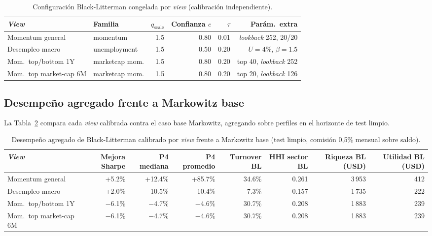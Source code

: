 \begin{table}[h]
\centering
\caption{Configuraci\'on Black-Litterman congelada por \textit{view}
(calibraci\'on independiente).}
\label{tab:configs_views}
\scriptsize
\begin{tabular}{@{}llrrrr@{}}
\toprule
\textit{View} & Familia & $q_{\text{scale}}$ & Confianza $c$ & $\tau$ & Par\'am.\ extra \\
\midrule
Momentum general & momentum & 1.5 & 0.80 & 0.01 & \textit{lookback} 252, 20/20 \\
Desempleo macro & unemployment & 1.5 & 0.50 & 0.20 & $U=4\%$, $\beta=1.5$ \\
Mom.\ top/bottom 1Y & marketcap mom. & 1.5 & 0.80 & 0.20 & top 40, \textit{lookback} 252 \\
Mom.\ top market-cap 6M & marketcap mom. & 1.5 & 0.80 & 0.20 & top 20, \textit{lookback} 126 \\
\bottomrule
\end{tabular}
\end{table}

\subsection{Desempe\~no agregado frente a Markowitz base}

La Tabla~\ref{tab:resumen_views} compara cada \textit{view} calibrada contra el
caso base Markowitz, agregando sobre perfiles en el horizonte de test limpio.

\begin{table}[h]
\centering
\caption{Desempe\~no agregado de Black-Litterman calibrado por \textit{view}
frente a Markowitz base (test limpio, comisi\'on 0,5\% mensual sobre saldo).}
\label{tab:resumen_views}
\scriptsize
\begin{adjustbox}{max width=\textwidth}
\begin{tabular}{@{}lrrrrrrr@{}}
\toprule
\textit{View} & Mejora Sharpe & P4 mediana & P4 promedio & Turnover BL & HHI sector BL & Riqueza BL (USD) & Utilidad BL (USD) \\
\midrule
Momentum general & +5.2\% & +12.4\% & +85.7\% & 34.6\% & 0.261 & 3\,953 & 412 \\
Desempleo macro & +2.0\% & $-$10.5\% & $-$10.4\% & 7.3\% & 0.157 & 1\,735 & 222 \\
Mom.\ top/bottom 1Y & $-$6.1\% & $-$4.7\% & $-$4.6\% & 30.7\% & 0.208 & 1\,883 & 239 \\
Mom.\ top market-cap 6M & $-$6.1\% & $-$4.7\% & $-$4.6\% & 30.7\% & 0.208 & 1\,883 & 239 \\
\bottomrule
\end{tabular}
\end{adjustbox}
\end{table}

